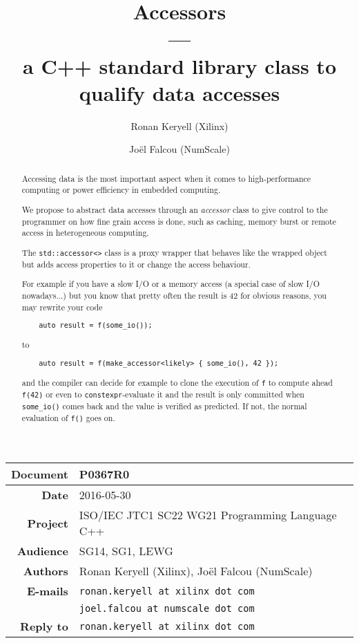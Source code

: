 \documentclass[a4paper]{article}
\title{Accessors\\
  ---\\
  a C++ standard library class to qualify data accesses}
\author{Ronan Keryell (Xilinx)
  \and Joël Falcou (NumScale)}
\begin{document}
\maketitle

\begin{tabular}{|r|l|}
  \hline
  \textbf{Document} & P0367R0\\\hline
  \textbf{Date} & 2016-05-30\\\hline
  \textbf{Project} & ISO/IEC JTC1 SC22 WG21 Programming Language C++\\\hline
  \textbf{Audience} & SG14, SG1, LEWG\\\hline
  \textbf{Authors} &  Ronan Keryell (Xilinx), Joël Falcou (NumScale)\\\hline
  \textbf{E-mails} & \texttt{ronan.keryell at xilinx dot com}\\
                   & \texttt{joel.falcou at numscale dot com}\\\hline
  \textbf{Reply to} & \texttt{ronan.keryell at xilinx dot com}\\\hline
\end{tabular}


\begin{abstract}
  Accessing data is the most important aspect when it comes to
  high-performance computing or power efficiency in embedded
  computing.

  We propose to abstract data accesses through an \emph{accessor}
  class to give control to the programmer on how fine grain access is
  done, such as caching, memory burst or remote access in
  heterogeneous computing.

  The \lstinline|std::accessor<>| class is a proxy wrapper that
  behaves like the wrapped object but adds access properties to it or
  change the access behaviour.

  For example if you have a slow I/O or a memory access (a special
  case of slow I/O nowadays...) but you know that pretty often the
  result is 42 for obvious reasons, you may rewrite your code
  \begin{lstlisting}
    auto result = f(some_io());
  \end{lstlisting}
  to
  \begin{lstlisting}
    auto result = f(make_accessor<likely> { some_io(), 42 });
  \end{lstlisting}
  and the compiler can decide for example to clone the execution of
  \lstinline|f| to compute ahead \lstinline|f(42)| or even to
  \lstinline|constexpr|-evaluate it and the result is only committed
  when \lstinline|some_io()| comes back and the value is verified as
  predicted. If not, the normal evaluation of \lstinline|f()| goes on.
\end{abstract}
\end{document}
